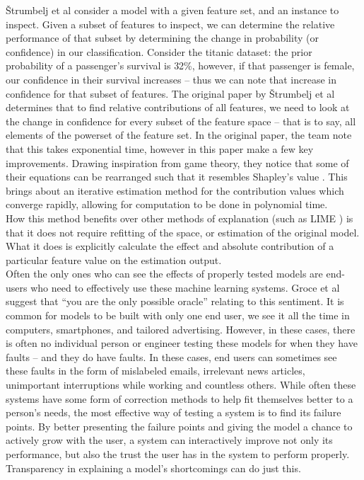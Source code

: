 \documentclass[a4paper]{article}
\begin{document}
\v{S}trumbelj et al \cite{strumbelj2010efficient} consider a model with a given feature set, and an instance to inspect. Given a subset of features to inspect, we can determine the relative performance of that subset by determining the change in probability (or confidence) in our classification. Consider the titanic dataset: the prior probability of a passenger’s survival is 32\%, however, if that passenger is female, our confidence in their survival increases – thus we can note that increase in confidence for that subset of features. The original paper by \v{S}trumbelj et al \cite{vstrumbelj2009explaining} determines that to find relative contributions of all features, we need to look at the change in confidence for every subset of the feature space – that is to say, all elements of the powerset of the feature set. In the original paper, the team note that this takes exponential time, however in this paper make a few key improvements. Drawing inspiration from game theory, they notice that some of their equations can be rearranged such that it resembles Shapley’s value \cite{shapely1953value}. This brings about an iterative estimation method for the contribution values which converge rapidly, allowing for computation to be done in polynomial time. \\

How this method benefits over other methods of explanation (such as LIME \cite{ribeiro2016should}) is that it does not require refitting of the space, or estimation of the original model. What it does is explicitly calculate the effect and absolute contribution of a particular feature value on the estimation output. \\


Often the only ones who can see the effects of properly tested models are end-users who need to effectively use these machine learning systems. Groce et al \cite{groce2013you} suggest that “you are the only possible oracle” relating to this sentiment. It is common for models to be built with only one end user, we see it all the time in computers, smartphones, and tailored advertising. However, in these cases, there is often no individual person or engineer testing these models for when they have faults – and they do have faults. In these cases, end users can sometimes see these faults in the form of mislabeled emails, irrelevant news articles, unimportant interruptions while working and countless others. While often these systems have some form of correction methods to help fit themselves better to a person’s needs, the most effective way of testing a system is to find its failure points. By better presenting the failure points and giving the model a chance to actively grow with the user, a system can interactively improve not only its performance, but also the trust the user has in the system to perform properly. Transparency in explaining a model’s shortcomings can do just this. \\
\end{document}

